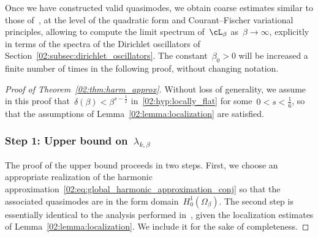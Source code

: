     Once we have constructed valid quasimodes, we obtain coarse estimates similar to those of~\cite{CFKS87,S83}, at the level of the quadratic form and Courant--Fischer variational principles, allowing to compute the limit spectrum of~$\cL_\beta$ as~$\beta\to\infty$, explicitly in terms of the spectra of the Dirichlet oscillators of Section~\ref{02:subsec:dirichlet_oscillators}.
    The constant~$\beta_0>0$ will be increased a finite number of times in the following proof, without changing notation.
    \begin{proof}[Proof of Theorem~\ref{02:thm:harm_approx}]
        Without loss of generality, we assume in this proof that~$\delta(\beta)<\beta^{s-\frac12}$ in~\eqref{02:hyp:locally_flat} for some~$0<s<\frac16$, so that the assumptions of Lemma~\ref{02:lemma:localization} are satisfied.
        \subsubsection{{Step 1: Upper bound on~$\lambda_{k,\beta}$}}
        The proof of the upper bound proceeds in two steps. First, we choose an appropriate realization of the harmonic approximation~\eqref{02:eq:global_harmonic_approximation_conj} so that the associated quasimodes are in the form domain~$H_0^1(\Omega_\beta)$. The second step is essentially identical to the analysis performed in~\cite[Theorem 11.1]{CFKS87}, given the localization estimates of Lemma~\ref{02:lemma:localization}. We include it for the sake of completeness.
        \medskip


\end{proof}
